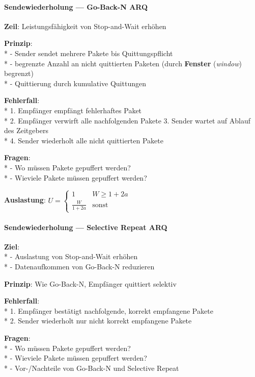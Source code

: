 \paragraph{Sendewiederholung --- Go-Back-N ARQ}
\begin{items}
  \item \textbf{Zeil}: Leistungsfähigkeit von Stop-and-Wait erhöhen
  \item \textbf{Prinzip}: \\*
    - Sender sendet mehrere Pakete bis Quittungspflicht \\*
    - begrenzte Anzahl an nicht quittierten Paketen (durch \textbf{Fenster} (\emph{window}) begrenzt) \\*
    - Quittierung durch kumulative Quittungen
  \item \textbf{Fehlerfall}: \\*
    1. Empfänger empfängt fehlerhaftes Paket \\*
    2. Empfänger verwirft alle nachfolgenden Pakete
    3. Sender wartet auf Ablauf des Zeitgebers \\*
    4. Sender wiederholt alle nicht quittierten Pakete
  \item \textbf{Fragen}: \\*
    - Wo müssen Pakete gepuffert werden? \\*
    - Wieviele Pakete müssen gepuffert werden?
  \item \textbf{Auslastung}: \( U = \begin{cases}
    1 & W \geq 1+2a \\
    \tfrac{W}{1+2a} & \text{sonst}
  \end{cases} \)
\end{items}

\paragraph{Sendewiederholung --- Selective Repeat ARQ}
\begin{items}
  \item \textbf{Ziel}: \\*
    - Auslastung von Stop-and-Wait erhöhen \\*
    - Datenaufkommen von Go-Back-N reduzieren
  \item \textbf{Prinzip}: Wie Go-Back-N, Empfänger quittiert selektiv
  \item \textbf{Fehlerfall}: \\*
    1. Empfänger bestätigt nachfolgende, korrekt empfangene Pakete \\*
    2. Sender wiederholt nur nicht korrekt empfangene Pakete
  \item \textbf{Fragen}: \\*
    - Wo müssen Pakete gepuffert werden? \\*
    - Wieviele Pakete müssen gepuffert werden? \\*
    - Vor-/Nachteile von Go-Back-N und Selective Repeat
\end{items}

